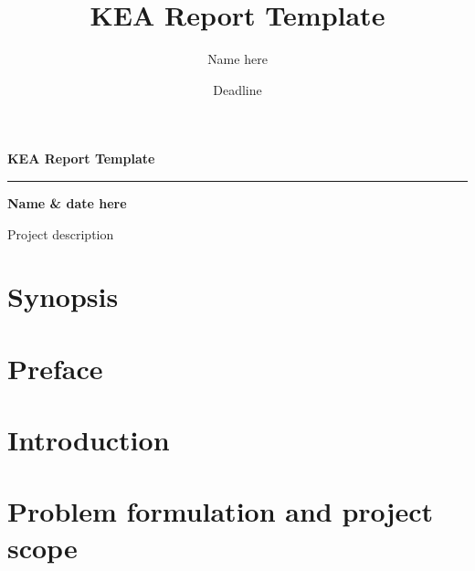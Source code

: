 \documentclass{report}
\title{KEA Report Template}
\author{Name here}
\date{Deadline}
\begin{document}
\maketitle
\clearpage

\begin{center}
\vspace*{5cm}

\textbf{KEA Report Template}

\vfill
\hrule
\vspace{0.5cm}
\textbf{Name \& date  here}

\vspace{5cm}
\end{center}

\begin{chapter}{Project description}
\section{Synopsis}
\lipsum[2-4]
\clearpage

\tableofcontents
\clearpage

\section{Preface}
\lipsum[1-5]
\clearpage

\section{Introduction}
\lipsum[3-5]
\clearpage

\section{Problem formulation and project scope}
\lipsum[3-5]
\clearpage
\end{chapter}
\end{document}
